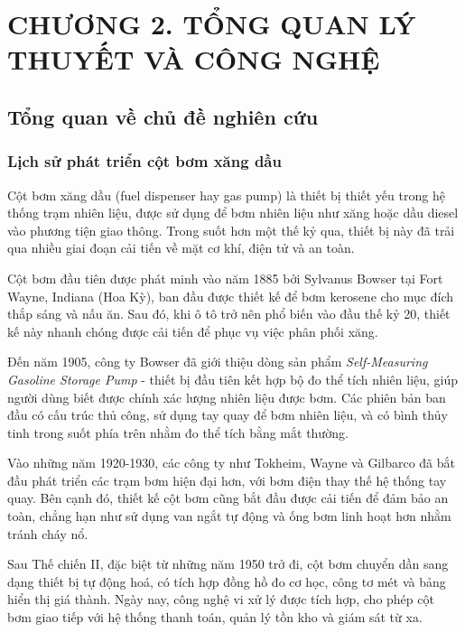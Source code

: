 \section*{CHƯƠNG 2. TỔNG QUAN LÝ THUYẾT VÀ CÔNG NGHỆ}

\setcounter{section}{2}
    \setcounter{subsection}{0}
        \setcounter{figure}{0}
            \setcounter{table}{0}

\subsection{Tổng quan về chủ đề nghiên cứu}

\subsubsection{Lịch sử phát triển cột bơm xăng dầu \cite{first-gas-pump-and-service-station}} 

Cột bơm xăng dầu (fuel dispenser hay gas pump) là thiết bị thiết yếu trong hệ thống trạm nhiên liệu, được sử dụng để bơm nhiên liệu như xăng hoặc dầu diesel vào phương tiện giao thông. Trong suốt hơn một thế kỷ qua, thiết bị này đã trải qua nhiều giai đoạn cải tiến về mặt cơ khí, điện tử và an toàn.

Cột bơm đầu tiên được phát minh vào năm 1885 bởi Sylvanus Bowser tại Fort Wayne, Indiana (Hoa Kỳ), ban đầu được thiết kế để bơm kerosene cho mục đích thắp sáng và nấu ăn. Sau đó, khi ô tô trở nên phổ biến vào đầu thế kỷ 20, thiết kế này nhanh chóng được cải tiến để phục vụ việc phân phối xăng.

Đến năm 1905, công ty Bowser đã giới thiệu dòng sản phẩm \textit{Self-Measuring Gasoline Storage Pump} - thiết bị đầu tiên kết hợp bộ đo thể tích nhiên liệu, giúp người dùng biết được chính xác lượng nhiên liệu được bơm. Các phiên bản ban đầu có cấu trúc thủ công, sử dụng tay quay để bơm nhiên liệu, và có bình thủy tinh trong suốt phía trên nhằm đo thể tích bằng mắt thường.

Vào những năm 1920-1930, các công ty như Tokheim, Wayne và Gilbarco đã bắt đầu phát triển các trạm bơm hiện đại hơn, với bơm điện thay thế hệ thống tay quay. Bên cạnh đó, thiết kế cột bơm cũng bắt đầu được cải tiến để đảm bảo an toàn, chẳng hạn như sử dụng van ngắt tự động và ống bơm linh hoạt hơn nhằm tránh cháy nổ.

Sau Thế chiến II, đặc biệt từ những năm 1950 trở đi, cột bơm chuyển dần sang dạng thiết bị tự động hoá, có tích hợp đồng hồ đo cơ học, công tơ mét và bảng hiển thị giá thành. Ngày nay, công nghệ vi xử lý được tích hợp, cho phép cột bơm giao tiếp với hệ thống thanh toán, quản lý tồn kho và giám sát từ xa.

